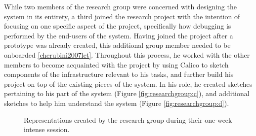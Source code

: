 \documentclass[12pt,fleqn]{ucithesis}
\begin{document}
%
%
%

While two members of the research group were concerned with designing the system in its entirety, a third joined the research project with the intention of focusing on one specific aspect of the project, specifically how debugging is performed by the end-users of the system. Having joined the project after a prototype was already created, this additional group member needed to be onboarded \ref{cherubini2007let}. Throughout this process, he worked with the other members to become acquainted with the project by using Calico to sketch components of the infrastructure relevant to his tasks, and further build his project on top of the existing pieces of the system. In his role, he created sketches pertaining to his part of the system (Figure \ref{fig:researchgroup:c}), and additional sketches to help him understand the system (Figure \ref{fig:researchgroup:d}).


\begin{figure}%
  \centering
   \caption {Representations created by the research group during their one-week intense session.}
   \label{fig:researchgroup:1}   
\end{figure}%
\end{document}
